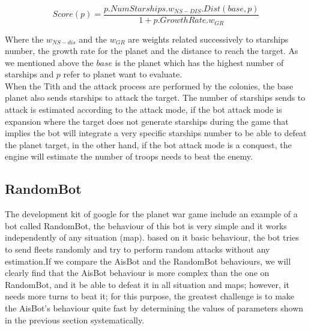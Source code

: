 \documentclass[conference]{IEEEtran}
\begin{document}
\begin{equation}
Score(p) = \frac{p.NumStarships.w_{NS-DIS}.Dist(base,p)}{1+p.GrowthRate.w_{GR}}
\end{equation}

Where the $w_{NS-dis}$ and the $w_{GR}$ are weights related successively to starships number, the growth rate for the planet and the distance to reach the target. As we mentioned above the $base$ is the planet which has the highest number of starships and $p$ refer to planet want to evaluate. \\ 

When the Tith and the attack process are performed by the colonies, the base planet also sends starships to attack the target. The number of starships sends to attack is estimated according to the attack mode, if the bot attack mode is expansion where the target does not generate starships during the game that implies the bot will integrate a very specific starships number to be able to defeat the planet target, in the other hand, if the bot attack mode is a conquest, the engine will estimate the number of troops needs to beat the enemy.




\subsection{RandomBot}
The development kit of google for the planet war game include an example of a bot called RandomBot, the behaviour of this bot is very simple and it works independently of any situation (map). based on it basic behaviour, the bot tries to send fleets randomly and try to perform random attacks without any estimation.If we compare the AisBot and the RandomBot behaviours, we will clearly find that the AisBot behaviour is more complex than the one on RandomBot, and it be able to defeat it in all situation and maps; however, it needs more turns to beat it; for this purpose, the greatest challenge is to make the AisBot's behaviour quite fast by determining the values of parameters shown in the previous section systematically.
\end{document}
